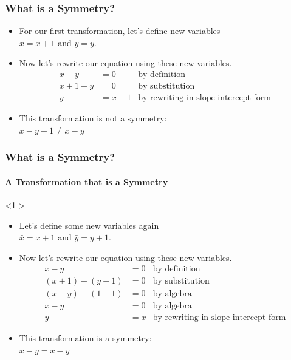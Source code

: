 \documentclass{beamer}
\begin{document}
\begin{frame}
    \frametitle{What is a Symmetry?}
    \begin{example}
        \begin{itemize}
            \item For our first transformation, let's define new variables\\ $\bar{x}=x+1$ and $\bar{y}=y$.
            \item Now let's rewrite our equation using these new variables. \begin{equation*}
                \begin{aligned}
                    \bar{x}-\bar{y} &= 0 & \text{by definition} \\
                    x+1-y &= 0 & \text{by substitution} \\
                    y &= x+1 & \text{by rewriting in slope-intercept form}
                \end{aligned}
            \end{equation*}
            \item This transformation is not a symmetry: \\ $x-y+1\ne x-y$
        \end{itemize}        
    \end{example}
\end{frame}


\begin{frame}
    \frametitle{What is a Symmetry?}
    \framesubtitle{A Transformation that is a Symmetry}
    \begin{example}[2]<1->
        \begin{itemize}
            \item Let's define some new variables again\\ $\bar{x}=x+1$ and $\bar{y}=y+1$.
            \item Now let's rewrite our equation using these new variables. \begin{equation*}
                \begin{aligned}
                    \bar{x}-\bar{y} &= 0 & \text{by definition} \\
                    (x+1)-(y+1) &= 0 & \text{by substitution} \\
                    (x-y)+(1-1) &= 0 & \text{by algebra} \\
                    x-y &= 0 & \text{by algebra} \\
                    y &= x & \text{by rewriting in slope-intercept form}
                \end{aligned}
            \end{equation*}
            \item This transformation is a symmetry: \\ $x-y = x-y$
        \end{itemize}        
    \end{example}
\end{frame}
\end{document}

